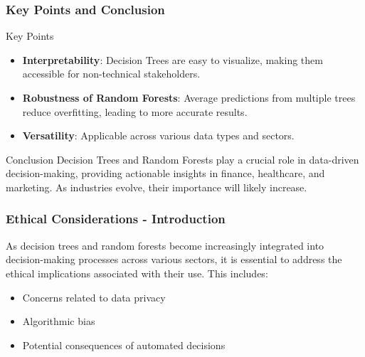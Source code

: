 \documentclass[aspectratio=169]{beamer}
\begin{document}
\begin{frame}[fragile]
    \frametitle{Key Points and Conclusion}

    \begin{block}{Key Points}
        \begin{itemize}
            \item \textbf{Interpretability}: Decision Trees are easy to visualize, making them accessible for non-technical stakeholders.
            \item \textbf{Robustness of Random Forests}: Average predictions from multiple trees reduce overfitting, leading to more accurate results.
            \item \textbf{Versatility}: Applicable across various data types and sectors.
        \end{itemize}
    \end{block}

    \begin{block}{Conclusion}
        Decision Trees and Random Forests play a crucial role in data-driven decision-making, providing actionable insights in finance, healthcare, and marketing. As industries evolve, their importance will likely increase.
    \end{block}
\end{frame}

\begin{frame}[fragile]
    \frametitle{Ethical Considerations - Introduction}
    As decision trees and random forests become increasingly integrated into decision-making processes across various sectors, it is essential to address the ethical implications associated with their use. This includes:
    \begin{itemize}
        \item Concerns related to data privacy
        \item Algorithmic bias
        \item Potential consequences of automated decisions
    \end{itemize}
\end{frame}
\end{document}
